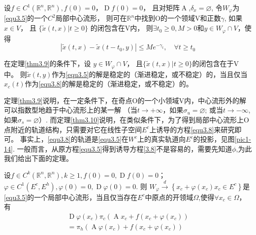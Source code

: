 \begin{theorem}[渐进性质定理]
	设$f \in C ^ { 1 } \left( \mathbb { R } ^ { n } , \mathbb { R } ^ { n } \right) , f ( 0 ) = 0，\operatorname { D } f ( 0 ) = 0$，
	且对矩阵\(\operatorname{A}\),$\delta _ { x } = \varnothing$,
	令\(W_\varphi\)为\ref{equ3.5}的一个\(C^2\)局部中心流形，
	则可在\(\mathbb{R}^n\)中找到O的一个领域V和正数\(\gamma\),
	如果\(x \in V\)，
	且 \( \{ \tilde{x} ( t , x ) | t \geqslant 0 \} \) 的闭包含在V内，
	则$\exists t _ { 0 } \geqslant 0 , M > 0$和\(y \in W _ { \varphi } \cap V\)，使得
	\begin{equation}
		\left| \tilde { x } ( t , x ) - \tilde { x } \left( t - t _ { 0 } , y \right) \right| \leqslant M e ^ { - \gamma _ { t } } , \quad \forall t \geqslant t _ { 0 }
		\label{eq1.3.13}
	\end{equation}
	\label{thm1.3.9}
\end{theorem}

\begin{theorem}[Pliss约化原理]
	在定理\ref{thm3.9}的条件下，设
	\(y \in W _ { \varphi } \cap V\)，
	且$\{ \tilde { x } ( t , x ) | t \geqslant 0 \}$的闭包含在于V中。
	则$\tilde { x } ( t , y )$作为\ref{equ3.5}的解是稳定的（渐进稳定，或不稳定）的，当且仅当\(x_c(t)\)作为\ref{equ3.8}的解是稳定的（渐进稳定，或不稳定）的。
	\label{thm1.3.9}
\end{theorem}

定理\ref{thm3.9}说明，在一定条件下，在奇点O的一个小领域V内，中心流形外的解可以指数型地趋于中心流形上的某一解
（当\(t\to +\infty\)，如果\(\sigma_u=\varnothing\);
或当\(t\to -\infty\),如果\(\sigma_s=\varnothing\)）.
而定理\ref{thm3.10}说明，在类似条件下，为了得到局部中心流形上O点附近的轨道结构，只需要对它在线性子空间\(E^c\)上诱导的方程\ref{equ3.8}来研究即可。
事实上，\ref{equ3.8}的轨道是\ref{equ3.5}在\(W^c\)上的真实轨道向\(E^c\)的投影，见图\ref{pic1-14}.
一般而言，从原方程\ref{equ3.5}得到诱导方程\ref{3.8}不是容易的，需要先知道\(\phi\),为此我们给出下面的定理。


\begin{theorem}
	设$f \in C ^ { k } \left( \mathbb{ R } ^ { n } , \mathbb{ R } ^ { n } \right) , k \geqslant 1 , f ( 0 ) = 0 , \operatorname { D } f ( 0 ) = 0$；
	$\varphi \in C ^ { 1 } \left( E ^ { c } , E ^ { h } \right) , \varphi ( 0 ) = 0 , \operatorname{D} \varphi ( 0 ) = 0$.
	则
	$W _ { \varphi } \stackrel { d } { \longrightarrow } \left\{ x _ { c } + \varphi \left( x _ { c } \right) x _ { c } \in E ^ { c }\right\}$是\ref{equ3.5}的一个局部中心流形，当且仅当存在\(E^c\)中原点的开领域\(\Omega\),使得$\forall x _ { c } \in \Omega$，有
	\begin{equation}
		\begin{aligned}
			\operatorname{D} \varphi \left( x _ { c } \right) \pi _ { c } \left( \operatorname{A} x _ { c } + f \left( x _ { c } + \varphi \left( x _ { c } \right) \right)\right. \\
			= \pi _ { h } \left( \operatorname{A} \varphi \left( x _ { c } \right) + f \left( x _ { c } + \varphi \left( x _ { c } \right) \right)\right.
		\end{aligned}
		\label{eq:1.3.14}
	\end{equation}
\end{theorem}

